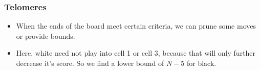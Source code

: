 \documentclass{beamer}
\begin{document}
    \begin{frame}
        \frametitle{Telomeres}
        \begin{center}
            \cleargoban
            \showgoban[b2,n2]
        \end{center}
        \begin{itemize}
            \item When the ends of the board meet certain criteria, we can prune some moves or provide bounds.
            \item Here, white need not play into cell 1 or cell 3, because that will only further decrease it's score. So we find a lower bound of $N-5$ for black.
        \end{itemize}
    \end{frame}
\end{document}
